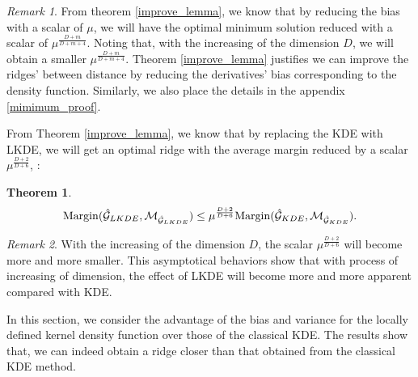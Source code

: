 \documentclass[aos,preprint]{imsart}
\newtheorem{theorem}{Theorem}[section]
\newtheorem{lemma}[theorem]{Lemma}
\theoremstyle{remark}
\newtheorem*{remark}{Remark}
\begin{document}
\begin{remark}
From theorem \ref{improve_lemma}, we know that by reducing the bias with a scalar of $\mu$, we will have the optimal minimum solution reduced with a scalar of $\mu^{\frac{D+m}{D+m+4}}$.  Noting that, with the increasing of the dimension $D$, we will obtain a smaller $\mu^{\frac{D+m}{D+m+4}}$. Theorem \ref{improve_lemma} justifies we can improve the ridges' between distance by reducing the derivatives' bias corresponding to the density function. Similarly, we also place the details in the appendix \ref{mimimum_proof}.
\end{remark}
From Theorem \ref{improve_lemma}, we know that by replacing the KDE with LKDE, we will get an optimal ridge with the average margin reduced by a scalar $\mu^{\frac{D+2}{D+6}}$, :
\begin{theorem}
\[
{\rm Margin}(\hat{\cal G}_{LKDE}, {\cal M}_{\hat{\cal G}_{LKDE}}) \leq \mu^{\frac{D+2}{D+6}} {\rm Margin}(\hat{\cal G}_{KDE}, {\cal M}_{\hat{\cal G}_{KDE}}).
\]
\end{theorem}
\begin{remark}
With the increasing of the dimension $D$, the scalar $\mu^{\frac{D+2}{D+6}}$ will become more and more smaller. This asymptotical behaviors show that with process of increasing of dimension, the effect of LKDE will become more and more apparent compared with KDE.
\end{remark}
  
In this section, we consider the advantage of the bias and variance for the locally defined kernel density function over those of the classical KDE. The results show that, we can indeed obtain a ridge closer than that obtained from the classical KDE method.
\end{document}
